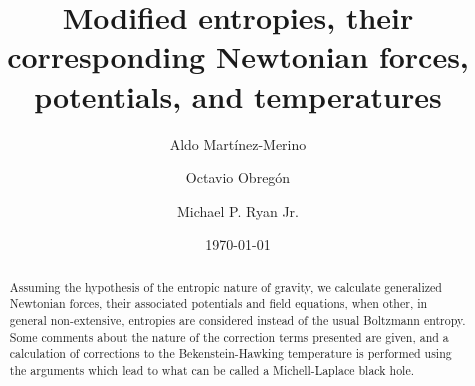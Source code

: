 \documentclass[nofootinbib,aps,prd,preprint,groupedaddress,showpacs,showkeys]{revtex4-1}
\begin{document}

\title{Modified entropies, their corresponding Newtonian forces, potentials, and temperatures}%

\author{Aldo Mart\'inez-Merino}
\author{Octavio Obreg\'on}%
%
\author{Michael P. Ryan Jr.}



\date{\today}%

\begin{abstract}
Assuming the hypothesis of the entropic nature of gravity, we calculate generalized Newtonian forces, their associated potentials and field equations, when other, in general non-extensive, entropies are considered instead of the usual Boltzmann entropy. Some comments about the nature of the correction terms presented are given, and a calculation of corrections to the Bekenstein-Hawking temperature is performed using the arguments which lead to what can be called a Michell-Laplace black hole.
\end{abstract}
\end{document}
